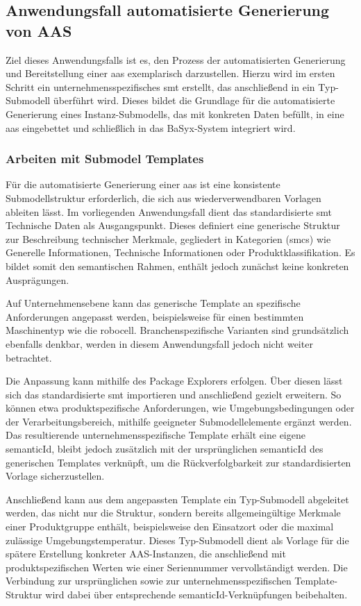 \newpage
\subsection{Anwendungsfall automatisierte Generierung von AAS}
Ziel dieses Anwendungsfalls ist es, den Prozess der automatisierten Generierung und Bereitstellung einer \acs{aas} exemplarisch darzustellen. 
Hierzu wird im ersten Schritt ein unternehmensspezifisches \acs{smt} erstellt, das anschließend in ein Typ-Submodell überführt wird.
Dieses bildet die Grundlage für die automatisierte Generierung eines Instanz-Submodells, das mit konkreten Daten befüllt, in eine \acs{aas} eingebettet und schließlich in das BaSyx-System integriert wird.

\subsubsection{Arbeiten mit Submodel Templates}
\label{chap:ErstellenvonSubmodelTemplates}
Für die automatisierte Generierung einer \acs{aas} ist eine konsistente Submodellstruktur erforderlich, die sich aus wiederverwendbaren Vorlagen ableiten lässt.
Im vorliegenden Anwendungsfall dient das standardisierte \acs{smt} Technische Daten \cite{SpezifikaitonTechnischeDaten} als Ausgangspunkt. 
Dieses definiert eine generische Struktur zur Beschreibung technischer Merkmale, gegliedert in Kategorien (\acsp{smc}) wie Generelle Informationen, Technische Informationen oder Produktklassifikation. 
Es bildet somit den semantischen Rahmen, enthält jedoch zunächst keine konkreten Ausprägungen.

Auf Unternehmensebene kann das generische Template an spezifische Anforderungen angepasst werden, beispielsweise für einen bestimmten Maschinentyp wie die robocell.
Branchenspezifische Varianten sind grundsätzlich ebenfalls denkbar, werden in diesem Anwendungsfall jedoch nicht weiter betrachtet.

Die Anpassung kann mithilfe des Package Explorers erfolgen.
Über diesen lässt sich das standardisierte \acs{smt} importieren und anschließend gezielt erweitern.
So können etwa produktspezifische Anforderungen, wie Umgebungsbedingungen oder der Verarbeitungsbereich, mithilfe geeigneter Submodellelemente ergänzt werden.
Das resultierende unternehmensspezifische Template erhält eine eigene semanticId, bleibt jedoch zusätzlich mit der ursprünglichen semanticId des generischen Templates verknüpft, um die Rückverfolgbarkeit zur standardisierten Vorlage sicherzustellen.

Anschließend kann aus dem angepassten Template ein Typ-Submodell abgeleitet werden, das nicht nur die Struktur, sondern bereits allgemeingültige Merkmale einer Produktgruppe enthält, beispielsweise den Einsatzort oder die maximal zulässige Umgebungstemperatur.
Dieses Typ-Submodell dient als Vorlage für die spätere Erstellung konkreter AAS-Instanzen, die anschließend mit produktspezifischen Werten wie einer Seriennummer vervollständigt werden.
Die Verbindung zur ursprünglichen sowie zur unternehmensspezifischen Template-Struktur wird dabei über entsprechende semanticId-Verknüpfungen beibehalten.


